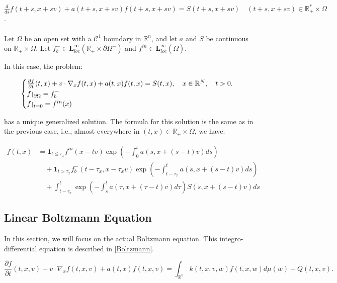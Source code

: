 \documentclass[a4paper, 11pt]{article}
\def\restriction#1#2{\mathchoice
	{\setbox1\hbox{${\displaystyle #1}_{\scriptstyle #2}$}
		\restrictionaux{#1}{#2}}
	{\setbox1\hbox{${\textstyle #1}_{\scriptstyle #2}$}
		\restrictionaux{#1}{#2}}
	{\setbox1\hbox{${\scriptstyle #1}_{\scriptscriptstyle #2}$}
		\restrictionaux{#1}{#2}}
	{\setbox1\hbox{${\scriptscriptstyle #1}_{\scriptscriptstyle #2}$}
		\restrictionaux{#1}{#2}}}
\def\restrictionaux#1#2{{#1\,\smash{\vrule height .8\ht1 depth .85\dp1}}_{\,#2}}
\begin{document}
$\frac{d}{ds}f(t+s,x+sv) +a(t+s,x+sv)f(t+s,x+sv) = S(t+s,x+sv) \quad (t+s,x+sv) \in \mathbb{R}_+^* \times \Omega$.


\paragraph{}



Let $\Omega$ be an open set with a $\mathcal{C}^1$ boundary in $\mathbb{R}^n$, and let $a$ and $S$ be continuous on $\mathbb{R}_+ \times \Omega$. Let $f_b^- \in \mathbf{L}_{loc}^{\infty}(\mathbb{R}_+ \times \partial \Omega^-)$ and $f^{in} \in \mathbf{L}_{loc}^{\infty}(\overline{\Omega})$.

In this case, the problem:

\[
\begin{cases}
	\frac{\partial f}{\partial t}(t,x)+v \cdot \nabla_x f(t,x)+ a(t,x)f(t,x)=S(t,x), \quad x \in \mathbb{R}^N, \quad t>0.\\
	\restriction{f}{\partial \Omega}= f_b^-\\
	\restriction{f}{t=0}= f^{in}(x)
\end{cases}
\]

has a unique generalized solution. The formula for this solution is the same as in the previous case, i.e., almost everywhere in $(t,x) \in \mathbb{R}_+ \times \Omega$, we have:

\[
\boxed{
	\begin{aligned}
		f(t,x) &= \mathbf{1}_{t \leq \tau_x} f^{in} (x-tv) \exp\left(-\int_0^t a(s,x+(s-t)v)ds\right) \\
		&\quad + \mathbf{1}_{t > \tau_x} f_b^- (t-\tau_x,x-\tau_x v) \exp\left(-\int_{t-\tau_x}^t a(s,x+(s-t)v)ds\right) \\
		&\quad + \int_{t-\tau_x}^t \exp\left(-\int_{s}^{t}a(\tau,x+(\tau-t)v)d\tau\right) S(s,x+(s-t)v)ds
\end{aligned}}
\]







\subsection{Linear Boltzmann Equation}

In this section, we will focus on the actual Boltzmann equation. This integro-differential equation is described in \ref{Boltzmann}.

\begin{equation} \label{Boltzmann}
	\frac{\partial f}{\partial t}(t,x,v)+v \cdot \nabla_x f(t,x,v) + a(t,x)f(t,x,v) = \int_{\mathbb{R}^n}k(t,x,v,w)f(t,x,w)d\mu(w)+Q(t,x,v).
\end{equation}
\end{document}
